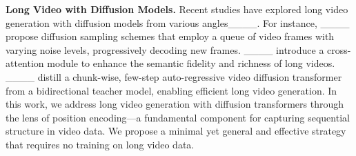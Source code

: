 
% 





\textbf{Long Video with Diffusion Models.}
Recent studies have explored long video generation with diffusion models from various angles____. For instance, ____ propose diffusion sampling schemes that employ a queue of video frames with varying noise levels, progressively decoding new frames. ____ introduce a cross-attention module to enhance the semantic fidelity and richness of long videos. ____ distill a chunk-wise, few-step auto-regressive video diffusion transformer from a bidirectional teacher model, enabling efficient long video generation.
In this work, we address long video generation with diffusion transformers through the lens of position encoding—a fundamental component for capturing sequential structure in video data. We propose a minimal yet general and effective strategy that requires no training on long video data.


